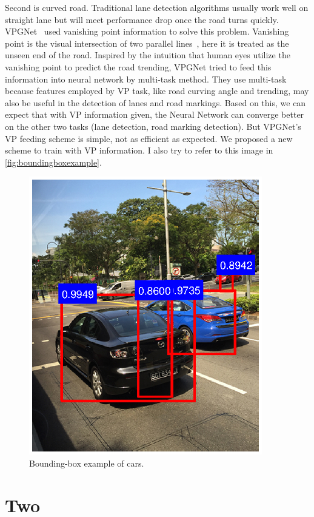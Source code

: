 \begin{spacing}{1.5}
Second is curved road. Traditional lane detection algorithms usually work well on straight lane but will meet performance drop once the road turns quickly. VPGNet~\cite{lee2017vpgnet} used vanishing point information to solve this problem. Vanishing point is the visual intersection of two parallel lines~\cite{barnard1983interpreting}, here it is treated as the unseen end of the road.  Inspired by the intuition that human eyes utilize the vanishing point to predict the road trending, VPGNet tried to feed this information into neural network by multi-task method. They use multi-task because features employed by VP task, like road curving angle and trending, may also be useful in the detection of lanes and road markings. Based on this, we can expect that with VP information given, the Neural Network can converge better on the other two tasks (lane detection, road marking detection). But VPGNet’s VP feeding scheme is simple, not as efficient as expected. We proposed a new scheme to train with VP information. I also try to refer to this image in \autoref{fig:boundingboxexample}.


\begin{figure}[ht]
\centering
\includegraphics[width=4in, fbox]{Chapter1/boundingbox.eps}
\caption{Bounding-box example of cars.}
\label{fig:boundingboxexample} 
\end{figure}


\section{Two}


\end{spacing}
